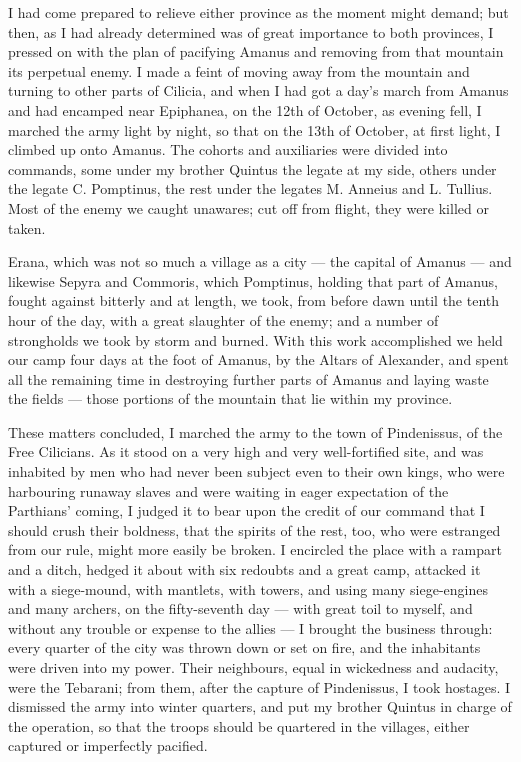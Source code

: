  I had come prepared to relieve either province as the moment might demand; but then, as I had already determined was of great importance to both provinces, I pressed on with the plan of pacifying Amanus and removing from that mountain its perpetual enemy. I made a feint of moving away from the mountain and turning to other parts of Cilicia, and when I had got a day's march from Amanus and had encamped near Epiphanea, on the 12th of October, as evening fell, I marched the army light by night, so that on the 13th of October, at first light, I climbed up onto Amanus. The cohorts and auxiliaries were divided into commands, some under my brother Quintus the legate at my side, others under the legate C. Pomptinus, the rest under the legates M. Anneius and L. Tullius. Most of the enemy we caught unawares; cut off from flight, they were killed or taken.

 Erana, which was not so much a village as a city --- the capital of Amanus --- and likewise Sepyra and Commoris, which Pomptinus, holding that part of Amanus, fought against bitterly and at length, we took, from before dawn until the tenth hour of the day, with a great slaughter of the enemy; and a number of strongholds we took by storm and burned. With this work accomplished we held our camp four days at the foot of Amanus, by the Altars of Alexander, and spent all the remaining time in destroying further parts of Amanus and laying waste the fields --- those portions of the mountain that lie within my province.

 These matters concluded, I marched the army to the town of Pindenissus, of the Free Cilicians. As it stood on a very high and very well-fortified site, and was inhabited by men who had never been subject even to their own kings, who were harbouring runaway slaves and were waiting in eager expectation of the Parthians' coming, I judged it to bear upon the credit of our command that I should crush their boldness, that the spirits of the rest, too, who were estranged from our rule, might more easily be broken. I encircled the place with a rampart and a ditch, hedged it about with six redoubts and a great camp, attacked it with a siege-mound, with mantlets, with towers, and using many siege-engines and many archers, on the fifty-seventh day --- with great toil to myself, and without any trouble or expense to the allies --- I brought the business through: every quarter of the city was thrown down or set on fire, and the inhabitants were driven into my power. Their neighbours, equal in wickedness and audacity, were the Tebarani; from them, after the capture of Pindenissus, I took hostages. I dismissed the army into winter quarters, and put my brother Quintus in charge of the operation, so that the troops should be quartered in the villages, either captured or imperfectly pacified.

